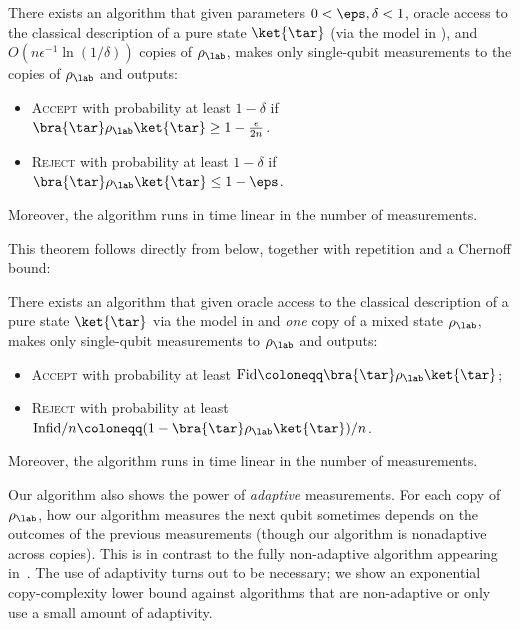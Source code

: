 \begin{maintheorem}\label{thm:main with repetitions}
    There exists an algorithm that given parameters $0 < \eps, \delta < 1$, oracle access to the classical description of a pure state $\ket{\tar}$ (via the model in ), and $O(n\epsilon^{-1}\ln(1/\delta))$ copies of $\rho_{\lab}$, makes only single-qubit measurements to the copies of $\rho_{\lab}$ and outputs:
    \begin{itemize}
        \item \textsc{Accept} with probability at least $1-\delta$ if $\bra{\tar}\rho_{\lab}\ket{\tar} \geq 1 - \frac{\epsilon}{2n}$.
        \item \textsc{Reject} with probability at least $1-\delta$ if $\bra{\tar}\rho_{\lab}\ket{\tar}\leq 1-\eps$.
    \end{itemize}
    Moreover, the algorithm runs in time linear in the number of measurements.\vspace{1ex}
\end{maintheorem}

This theorem follows directly from  below, together with repetition and a Chernoff bound:
\begin{theorem}\label{thm:main}
    There exists an algorithm that given oracle access to the classical description of a pure state $\ket{\tar}$ via the model in  and \emph{one} copy of a mixed state $\rho_{\lab}$, makes only single-qubit measurements to $\rho_{\lab}$ and outputs: 
    \begin{itemize}
        \item \textsc{Accept} with probability at least $\text{Fid} \coloneqq \bra{\tar}\rho_{\lab}\ket{\tar}$;
        \item \textsc{Reject} with probability at least $\text{Infid}/n \coloneqq (1-\bra{\tar}\rho_{\lab}\ket{\tar})/n$.
    \end{itemize}
    Moreover, the algorithm runs in time linear in the number of measurements.
\end{theorem}

Our algorithm also shows the power of \emph{adaptive} measurements.  For each copy of $\rho_{\lab}$, how our algorithm measures the next qubit sometimes depends on the outcomes of the previous measurements (though our algorithm is nonadaptive across copies).  This is in contrast to the fully non-adaptive algorithm appearing in~\cite{huang2024certifying}. %
The use of adaptivity turns out to be necessary; we show an exponential copy-complexity lower bound against algorithms that are non-adaptive or only use a small amount of adaptivity.

